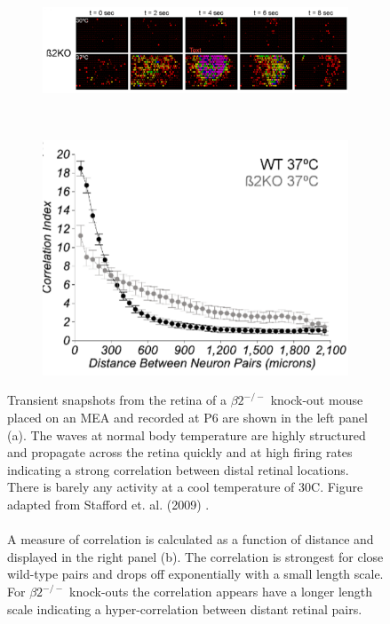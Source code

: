 \begin{figure}
	\begin{subfigure}{0.6\textwidth}
		\centering
		\includegraphics[width = \textwidth]{images/introduction/meaBeta2}
	\end{subfigure}
	~
	\begin{subfigure}{ 0.4\textwidth}
		\centering
		\includegraphics[width = \textwidth]{images/introduction/betacorrelation}
	\end{subfigure}

	\def\c{MEA recordings and correlational profile of retinal waves in the $\beta2^{-/-}$ mouse. }
	\caption[\c]{\label{fig:beta2mea} Transient snapshots from the retina of a $\beta2^{-/-}$ knock-out mouse placed on an MEA and recorded at P6 are shown in the left panel (a). The waves at normal body temperature are highly structured and propagate across the retina quickly and at high firing rates indicating a strong correlation between distal retinal locations. There is barely any activity at a cool temperature of 30C. Figure adapted from Stafford et. al. (2009) \cite{Stafford2009}.
	\\\\
	A measure of correlation is calculated as a function of distance and displayed in the right panel (b). The correlation is strongest for close wild-type pairs and drops off exponentially with a small length scale. For $\beta2^{-/-}$ knock-outs the correlation appears have a longer length scale indicating a hyper-correlation between distant retinal pairs.}
\end{figure}


